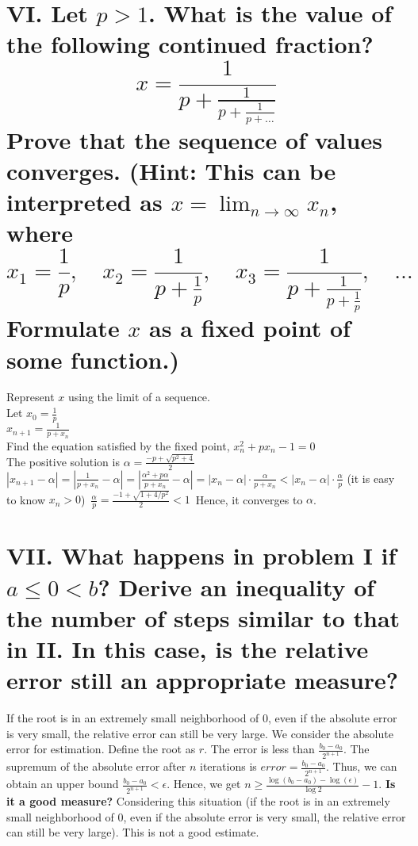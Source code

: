 \documentclass[a4paper]{article}
\begin{document}
\section*{VI. Let \( p > 1 \). What is the value of the following continued fraction?
\[
x = \frac{1}{p + \frac{1}{p + \frac{1}{p + \ldots}}}
\]
Prove that the sequence of values converges. (Hint: This can be interpreted as \( x = \lim_{n \to \infty} x_n \), where 
\[
x_1 = \frac{1}{p}, \quad x_2 = \frac{1}{p + \frac{1}{p}}, \quad x_3 = \frac{1}{p + \frac{1}{p + \frac{1}{p}}}, \quad \ldots
\]
Formulate \( x \) as a fixed point of some function.)}

Represent \( x \) using the limit of a sequence.\\
Let \( x_0 = \frac{1}{p} \)\\
\( x_{n+1} = \frac{1}{p + x_n} \)\\
Find the equation satisfied by the fixed point, \( x_n^2 + px_n - 1 = 0 \)\\
The positive solution is \( \alpha = \frac{-p + \sqrt{p^2 + 4}}{2} \)\\
\( |x_{n+1} - \alpha| = \left|\frac{1}{p + x_n} - \alpha\right| = \left|\frac{\alpha^2 + p\alpha}{p + x_n} - \alpha\right| = |x_n - \alpha| \cdot \frac{\alpha}{p + x_n} < |x_n - \alpha| \cdot \frac{\alpha}{p} \) (it is easy to know \( x_n > 0 \))\
\( \frac{\alpha}{p} = \frac{-1 + \sqrt{1 + 4/p^2}}{2} < 1 \)\
Hence, it converges to \( \alpha \).

\section*{VII. What happens in problem I if \( a \leq 0 < b \)? Derive an inequality of the number of steps similar to that in II. In this case, is the relative error still an appropriate measure?}

If the root is in an extremely small neighborhood of 0, even if the absolute error is very small, the relative error can still be very large.
We consider the absolute error for estimation.
Define the root as \( r \).
The error is less than \( \frac{b_0-a_0}{2^{n+1}} \).
The supremum of the absolute error after \( n \) iterations is \( error = \frac{b_0-a_0}{2^{n+1}} \).
Thus, we can obtain an upper bound \( \frac{b_0-a_0}{2^{n+1}} < \epsilon \).
Hence, we get \( n \geq \frac{\log(b_0-a_0) - \log(\epsilon)}{\log 2} - 1 \).
\textbf{Is it a good measure?}
Considering this situation (if the root is in an extremely small neighborhood of 0, even if the absolute error is very small, the relative error can still be very large).
This is not a good estimate.
\end{document}

